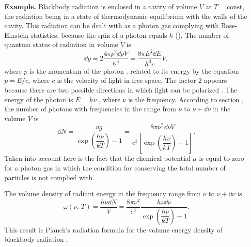 \textbf{Example.} Blackbody radiation  is enclosed in a cavity of volume $V$ at $T = \text{const}$, the radiation being in a state of thermodynamic equilibrium with the walls of the cavity. This radiation can be dealt with as a photon gas complying with Bose-Einstein statistics, because the spin of a photon equals $\hbar$ (). The number of quantum states of radiation in volume $V$  is
\begin{equation*}%
\dd g = 2 \frac{4 \pi p^{2} \dd pV}{h^{3}} = \frac{8\pi E^{2} \dd E}{h^{3}c} V,
\end{equation*}
where $p$ is the momentum of the photon , related to its energy by the equation $p = E/c$, where $c$ is the velocity of light in free space. The factor 2 appears because there are two possible directions in which light can be polarized . The energy of the photon is $E = h\nu$ , where $\nu$ is the frequency. According to section , the number of photons with frequencies in the range from $\nu$ to $\nu + \dd \nu$ in the volume $V$ is
\begin{equation*}%
\dd N = \frac{\dd g}{\exp \left(\dfrac{h \nu}{kT} \right) -1} = \frac{8 \pi \nu^{2} \dd \nu V}{c^{3} [\exp \left(\dfrac{h \nu}{kT} \right) -1]}.
\end{equation*}
Taken into account here is the fact that the chemical potential $\mu$  is equal to zero for a photon gas in which the condition for conserving the total number of particles is not complied with.

The volume density of radiant energy in the frequency range
from $\nu$ to $\nu + \dd \nu$ is
\begin{equation*}%
\omega (\nu, \, T) = \frac{h \nu \dd N}{V} = \frac{8 \pi \nu^{2}}{c^{3}} \frac{h \nu \dd \nu}{\exp \left(\dfrac{h \nu}{kT} \right) -1}.
\end{equation*}
This result is Planck's radiation formula for the volume energy density of blackbody radiation .


